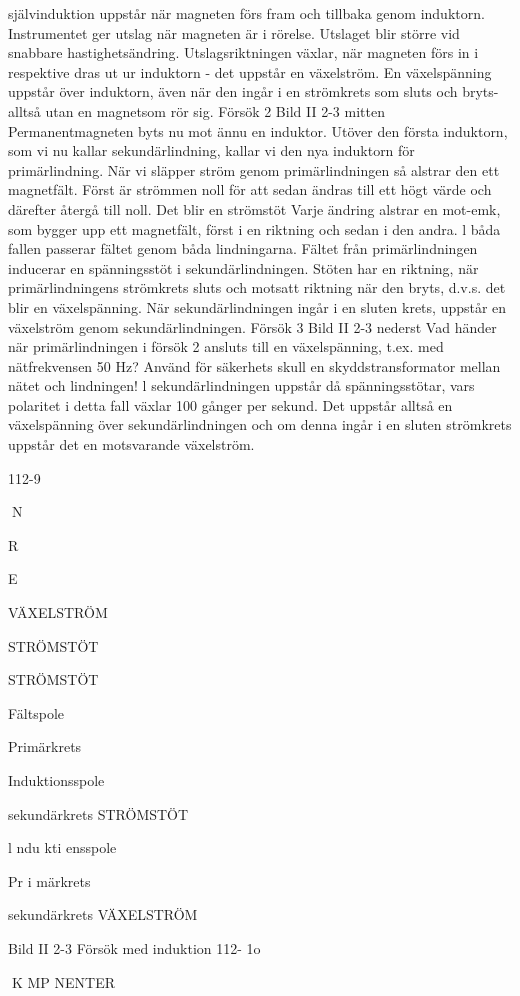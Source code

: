 \documentclass[a4paper,twoside,twocolumn,openright]{book}
\begin{document}
{{självinduktion uppstår när magneten förs
fram och tillbaka genom induktorn.
Instrumentet ger utslag när magneten är
i rörelse. Utslaget blir större vid snabbare
hastighetsändring. Utslagsriktningen växlar,
när magneten förs in i respektive dras ut ur
induktorn - det uppstår en växelström.
En växelspänning uppstår över induktorn,
även när den ingår i en strömkrets som sluts
och bryts-alltså utan en magnetsom rör sig.
Försök 2
Bild II 2-3 mitten
Permanentmagneten byts nu mot ännu en
induktor. Utöver den första induktorn, som vi
nu kallar sekundärlindning, kallar vi den nya
induktorn för primärlindning.
När vi släpper ström genom primärlindningen så alstrar den ett magnetfält. Först är
strömmen noll för att sedan ändras till ett
högt värde och därefter återgå till noll. Det
blir en strömstöt
Varje ändring alstrar en mot-emk, som
bygger upp ett magnetfält, först i en riktning
och sedan i den andra. l båda fallen passerar
fältet genom båda lindningarna. Fältet från
primärlindningen inducerar en spänningsstöt i sekundärlindningen. Stöten har en riktning, när primärlindningens strömkrets sluts
och motsatt riktning när den bryts, d.v.s. det
blir en växelspänning. När sekundärlindningen ingår i en sluten krets, uppstår en
växelström genom sekundärlindningen.
Försök 3
Bild II 2-3 nederst
Vad händer när primärlindningen i försök 2
ansluts till en växelspänning, t.ex. med nätfrekvensen 50 Hz? Använd för säkerhets
skull en skyddstransformator mellan nätet
och lindningen!
l sekundärlindningen uppstår då spänningsstötar, vars polaritet i detta fall växlar
100 gånger per sekund. Det uppstår alltså en
växelspänning över sekundärlindningen och
om denna ingår i en sluten strömkrets uppstår det en motsvarande växelström.

112-9

N

R

E

VÄXELSTRÖM

STRÖMSTÖT

STRÖMSTÖT

Fältspole

Primärkrets

Induktionsspole

sekundärkrets
STRÖMSTÖT

l ndu kti ensspole

Pr i märkrets

sekundärkrets
VÄXELSTRÖM

Bild II 2-3 Försök med induktion
112- 1o

K MP NENTER

}}
\end{document}
